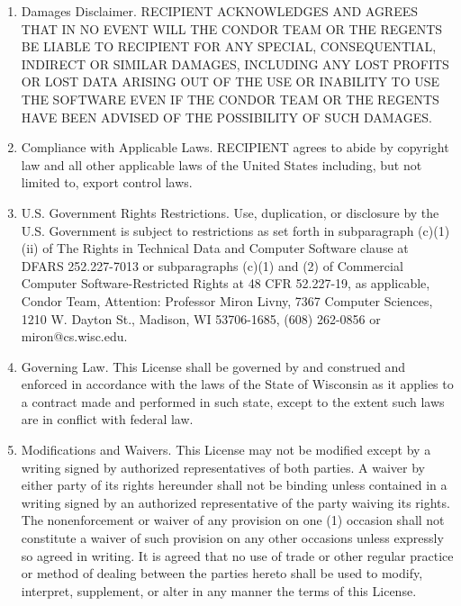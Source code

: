 \begin{enumerate}
\item Damages Disclaimer.  RECIPIENT ACKNOWLEDGES AND AGREES THAT IN
NO EVENT WILL THE CONDOR TEAM OR THE REGENTS BE LIABLE TO RECIPIENT
FOR ANY SPECIAL, CONSEQUENTIAL, INDIRECT OR SIMILAR DAMAGES, INCLUDING
ANY LOST PROFITS OR LOST DATA ARISING OUT OF THE USE OR INABILITY TO
USE THE SOFTWARE EVEN IF THE CONDOR TEAM OR THE REGENTS HAVE BEEN
ADVISED OF THE POSSIBILITY OF SUCH DAMAGES.

\item Compliance with Applicable Laws.  RECIPIENT agrees to abide by
copyright law and all other applicable laws of the United States
including, but not limited to, export control laws.

\item U.S. Government Rights Restrictions.  Use, duplication, or
disclosure by the U.S. Government is subject to restrictions as set
forth in subparagraph (c)(1)(ii) of The Rights in Technical Data and
Computer Software clause at DFARS 252.227-7013 or subparagraphs (c)(1)
and (2) of Commercial Computer Software-Restricted Rights at 48 CFR
52.227-19, as applicable, Condor Team, Attention: Professor Miron
Livny, 7367 Computer Sciences, 1210 W. Dayton St., Madison, WI
53706-1685, (608) 262-0856 or miron@cs.wisc.edu.

\item Governing Law.  This License shall be governed by and construed and enforced in accordance with the laws of the State of Wisconsin as it applies to a contract made and performed in such state, except to the extent such laws are in conflict with federal law.

\item Modifications and Waivers.  This License may not be modified
except by a writing signed by authorized representatives of both
parties.  A waiver by either party of its rights hereunder shall not
be binding unless contained in a writing signed by an authorized
representative of the party waiving its rights.  The nonenforcement or
waiver of any provision on one (1) occasion shall not constitute a
waiver of such provision on any other occasions unless expressly so
agreed in writing.  It is agreed that no use of trade or other regular
practice or method of dealing between the parties hereto shall be used
to modify, interpret, supplement, or alter in any manner the terms of
this License.

\end{enumerate}

